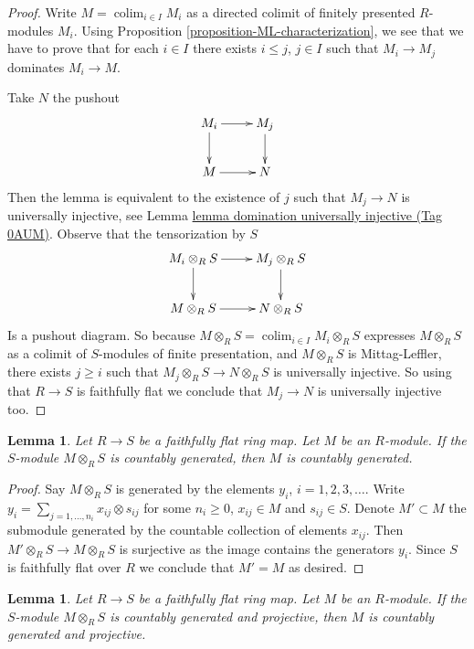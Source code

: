 \documentclass{amsart}
\theoremstyle{plain}
\newtheorem{lemma}[subsection]{Lemma}
\theoremstyle{definition}
\theoremstyle{remark}
\numberwithin{equation}{subsection}
\def\colim{\mathop{\mathrm{colim}}\nolimits}
\begin{document}
\begin{proof}
Write $M = \colim_{i\in I} M_i$ as a directed colimit
of finitely presented $R$-modules $M_i$.
Using Proposition \ref{proposition-ML-characterization}, we see that we
have to prove that for each $i \in I$ there exists $i \leq j$, $j\in I$
such that $M_i\rightarrow M_j$ dominates $M_i\rightarrow M$.

\medskip\noindent
Take $N$ the pushout
$$
\xymatrix{
M_i  \ar[r] \ar[d] & M_j \ar[d] \\
M \ar[r] & N
}
$$
Then the lemma is equivalent to the existence of $j$ such that
$M_j\rightarrow N$ is universally injective, see
Lemma \href{https://stacks.math.columbia.edu/tag/0AUM}{lemma domination universally injective (Tag 0AUM)}.
Observe that the tensorization by $S$
$$
\xymatrix{
M_i\otimes_R S  \ar[r] \ar[d] & M_j\otimes_R S \ar[d] \\
M\otimes_R S \ar[r] & N\otimes_R S
}
$$
Is a pushout diagram.  So because
$M \otimes_R S = \colim_{i\in I} M_i \otimes_R S$
expresses $M\otimes_R S$ as a colimit of $S$-modules of
finite presentation, and $M\otimes_R S$ is Mittag-Leffler,
there exists $j \geq i$ such that $M_j\otimes_R S\rightarrow N\otimes_R S$
is universally injective. So using that $R\rightarrow S$ is faithfully flat
we conclude that $M_j\rightarrow N$ is universally injective too.
\end{proof}


\begin{lemma}
\label{lemma-ffdescent-countable}
Let $R \to S$ be a faithfully flat ring map. Let $M$ be an $R$-module. If
the $S$-module $M \otimes_R S$ is countably generated, then $M$
is countably generated.
\end{lemma}

\begin{proof}
Say $M \otimes_R S$ is generated by the elements
$y_i$, $i = 1, 2, 3, \ldots$. Write $y_i = \sum_{j = 1, \ldots, n_i}
x_{ij} \otimes s_{ij}$ for some $n_i \geq 0$, $x_{ij} \in M$
and $s_{ij} \in S$. Denote $M' \subset M$ the submodule generated
by the countable collection of elements $x_{ij}$. Then
$M' \otimes_R S \to M \otimes_R S$ is surjective as the
image contains the generators $y_i$. Since $S$ is faithfully flat
over $R$ we conclude that $M' = M$ as desired.
\end{proof}


\begin{lemma}
\label{lemma-ffdescent-countable-projectivity}
Let $R \to S$ be a faithfully flat ring map.  Let $M$ be an $R$-module.
 If the $S$-module $M \otimes_R S$ is countably generated and projective,
then $M$ is countably generated and projective.
\end{lemma}
\end{document}
